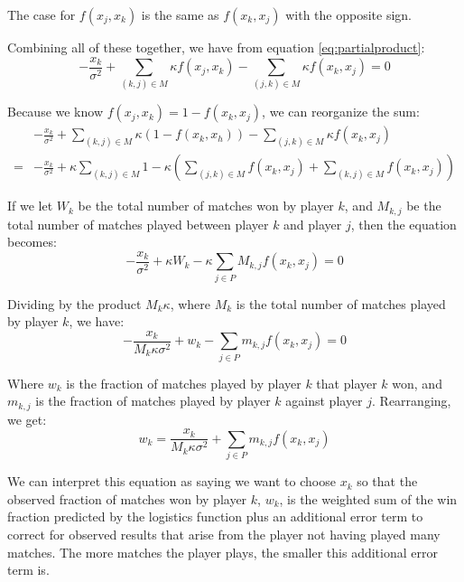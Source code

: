 \documentclass{article}
\begin{document}
The case for $f(x_j, x_k)$ is the same as $f(x_k, x_j)$ with the opposite
sign.

Combining all of these together, we have from equation \ref{eq:partialproduct}:
\begin{equation*}
  - \frac{x_k}{\sigma^2}
  + \sum_{(k, j) \in M} \kappa f(x_j, x_k)
  - \sum_{(j, k) \in M} \kappa f(x_k, x_j) = 0
\end{equation*}

Because we know $f(x_j, x_k) = 1 - f(x_k, x_j)$, we can reorganize the sum:
\begin{align*}
  &- \frac{x_k}{\sigma^2}
  + \sum_{(k, j) \in M} \kappa (1 - f(x_k, x_h))
  - \sum_{(j, k) \in M} \kappa f(x_k, x_j) \\
  = &- \frac{x_k}{\sigma^2}
  + \kappa \sum_{(k, j) \in M} 1
  - \kappa \left(\sum_{(j, k) \in M} f(x_k, x_j) + \sum_{(k, j) \in M} f(x_k, x_j)\right) 
\end{align*}

If we let $W_k$ be the total number of matches won by player $k$, and $M_{k,j}$
be the total number of matches played between player $k$ and player $j$, then
the equation becomes:
\begin{equation*}
  - \frac{x_k}{\sigma^2} + \kappa W_k - \kappa \sum_{j \in P} M_{k,j} f(x_k, x_j) = 0
\end{equation*}

Dividing by the product $M_k \kappa$, where $M_k$ is the total number of matches
played by player $k$, we have:
\begin{equation*}
  - \frac{x_k}{M_k \kappa \sigma^2} + w_k - \sum_{j \in P} m_{k, j} f(x_k, x_j) = 0
\end{equation*}

Where $w_k$ is the fraction of matches played by player $k$ that player $k$
won, and $m_{k, j}$ is the fraction of matches played by player $k$ against
player $j$. Rearranging, we get:
\begin{equation}
  w_k = \frac{x_k}{M_k \kappa \sigma^2} + \sum_{j \in P} m_{k, j} f(x_k, x_j)
\end{equation}

We can interpret this equation as saying we want to choose $x_k$ so that the
observed fraction of matches won by player $k$, $w_k$, is the weighted sum of the
win fraction predicted by the logistics function plus an additional error term
to correct for observed results that arise from the player not having played
many matches. The more matches the player plays, the smaller this additional
error term is.
\end{document}
